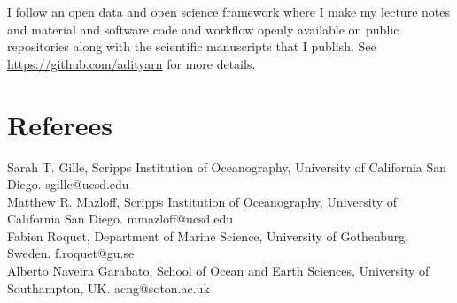 \documentclass[12pt, a4paper]{article}
\newcommand{\numbers}[1]{\marginnote{\small #1}}
\begin{document}
I follow an open data and open science framework where I make my lecture notes and material and software code and workflow openly available on public repositories along with the scientific manuscripts that I publish. See \url{https://github.com/adityarn} for more details.


\section*{Referees}

\numbers{■} Sarah T. Gille, Scripps Institution of Oceanography, University of California San Diego. sgille@ucsd.edu\\
\numbers{■} Matthew R. Mazloff, Scripps Institution of Oceanography, University of California San Diego. mmazloff@ucsd.edu\\
\numbers{■} Fabien Roquet, Department of Marine Science, University of Gothenburg, Sweden. f.roquet@gu.se\\
\numbers{■} Alberto Naveira Garabato, School of Ocean and Earth Sciences, University of Southampton, UK. acng@soton.ac.uk\\
\end{document}
